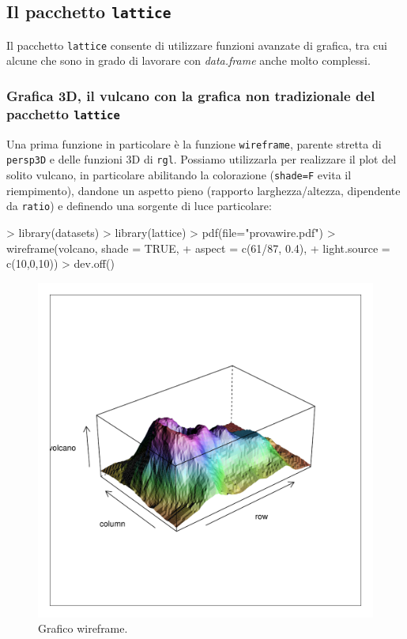 \documentclass[onecolumn,11pt]{book}
\begin{document}
\subsection{Il pacchetto  \texttt{lattice}}
Il pacchetto \texttt{lattice} consente di utilizzare funzioni avanzate di grafica, tra cui alcune che sono in grado di lavorare con \emph{data.frame} anche molto complessi.
\subsubsection{Grafica 3D, il vulcano con la grafica non tradizionale del pacchetto \texttt{lattice}}
Una prima funzione in particolare  \`e la funzione \texttt{wireframe}, parente stretta di \texttt{persp3D} e delle funzioni 3D di \texttt{rgl}.
Possiamo utilizzarla per realizzare il plot del solito vulcano, in particolare abilitando la colorazione (\texttt{shade=F} evita  il riempimento), dandone un aspetto pieno (rapporto larghezza/altezza, dipendente da \texttt{ratio}) e definendo una sorgente di luce particolare:
\begin{Schunk}
\begin{Sinput}
> library(datasets)
> library(lattice)
> pdf(file="provawire.pdf")
> wireframe(volcano, shade = TRUE,
+ aspect = c(61/87, 0.4),
+ light.source = c(10,0,10))
> dev.off()
\end{Sinput}
\end{Schunk}

\begin{figure}[htbp]
\begin{center}
\includegraphics[scale=0.6]{../grafici/wire.pdf}
\caption{Grafico wireframe.}
\label{wirex}
\end{center}
\end{figure}
\end{document}
